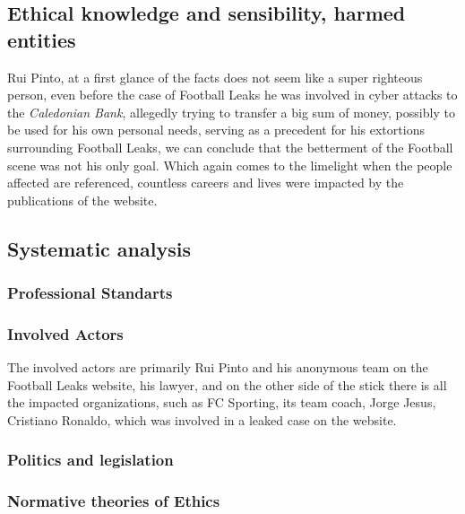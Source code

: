 \subsection{Ethical knowledge and sensibility, harmed entities}
Rui Pinto, at a first glance of the facts does not seem like a super righteous person, even before the case of Football Leaks he was involved in cyber attacks to the \textit{Caledonian Bank}, allegedly trying to transfer a big sum of money, possibly to be used for his own personal needs, serving as a precedent for his extortions surrounding Football Leaks, we can conclude that the betterment of the Football scene was not his only goal.
Which again comes to the limelight when the people affected are referenced, countless careers and lives were impacted by the publications of the website.

\subsection{Systematic analysis}
\subsubsection{Professional Standarts}
\subsubsection{Involved Actors}
The involved actors are primarily Rui Pinto and his anonymous team on the Football Leaks website, his lawyer, and on the other side of the stick there is all the impacted organizations, such as FC Sporting, its team coach, Jorge Jesus, Cristiano Ronaldo, which was involved in a leaked case on the website.
\subsubsection{Politics and legislation}
\subsubsection{Normative theories of Ethics}


